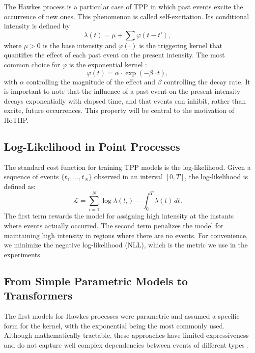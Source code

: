 \documentclass[runningheads]{llncs}
\begin{document}
The Hawkes process \cite{hawkes1971spectra} is a particular case of TPP in which past events excite the occurrence of new ones. This phenomenon is called self-excitation. Its conditional intensity is defined by
%
\begin{equation}
\lambda(t) = \mu + \sum \varphi(t - t'),
\end{equation}
%
where $\mu > 0$ is the base intensity and $\varphi(\cdot)$ is the triggering kernel that quantifies the effect of each past event on the present intensity. The most common choice for $\varphi$ is the exponential kernel \cite{laub_hawkes_2025}:
%
\begin{equation}
\varphi(t) = \alpha \cdot \exp(-\beta \cdot t),
\end{equation}
%
with $\alpha$ controlling the magnitude of the effect and $\beta$ controlling the decay rate. It is important to note that the influence of a past event on the present intensity decays exponentially with elapsed time, and that events can inhibit, rather than excite, future occurrences. This property will be central to the motivation of HoTHP.

\subsection{Log-Likelihood in Point Processes}

The standard cost function for training TPP models is the log-likelihood. Given a sequence of events $\{t_1, \ldots, t_N\}$ observed in an interval $[0, T]$, the log-likelihood is defined as:
%
\begin{equation}
\mathcal{L} = \sum_{i=1}^{N} \log \lambda(t_i) - \int_0^T \lambda(t) \, dt.
\end{equation}
%
The first term rewards the model for assigning high intensity at the instants where events actually occurred. The second term penalizes the model for maintaining high intensity in regions where there are no events. For convenience, we minimize the negative log-likelihood (NLL), which is the metric we use in the experiments.

\subsection{From Simple Parametric Models to Transformers}

The first models for Hawkes processes were parametric and assumed a specific form for the kernel, with the exponential being the most commonly used. Although mathematically tractable, these approaches have limited expressiveness and do not capture well complex dependencies between events of different types \cite{shchur2021neural}.
\end{document}
